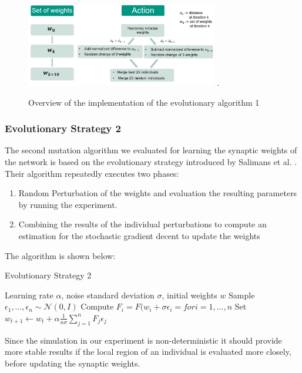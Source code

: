 \begin{figure}[H]
	\centering
	\includegraphics[width=3.3in]{img/evo_strat_1.png}
	\DeclareGraphicsExtensions.
	\caption{Overview of the implementation of the evolutionary algorithm 1}
	\label{fig:evo_strat_1}
\end{figure}

\subsubsection{Evolutionary Strategy 2}
\label{sec:strategie_2}
The second mutation algorithm we evaluated for learning the synaptic weights of the network is based on the evolutionary strategy introduced by Salimans et al. \cite{Salimans2017EvolutionSA}. Their algorithm repeatedly executes two phases:
\begin{enumerate}
	\item Random Perturbation of the weights and evaluation the resulting parameters by running the experiment.
	\item Combining the results of the individual perturbations to compute an estimation for the stochastic gradient decent to update the weights
\end{enumerate}
The algorithm is shown below: 
\begin{algorithm}
	\caption{Evolutionary Strategy 2}
	\begin{algorithmic}[1]
		\renewcommand{\algorithmicrequire}{\textbf{Input:}}
		\REQUIRE Learning rate $\alpha$, noise standard deviation $\sigma$, initial weights $w$
		\STATE Sample $\epsilon_{1},...,\epsilon_{n} \sim \mathcal{N}\left( 0, I \right)$
		\STATE Compute $F_{ i } = F(w_{ i } + \sigma \epsilon_{ i }= for i = 1, ..., n$
		\STATE Set $w_{ t+1 } \leftarrow  w_{ t }+ \alpha \frac{ 1 }{ n \sigma } \sum_{ j = 1 }^{ n }{F_{ j } \epsilon_{ j }  }$
		\ENDFOR
	\end{algorithmic} 
\end{algorithm}
Since the simulation in our experiment is non-deterministic it should provide more stable results if the local region of an individual is evaluated more closely, before updating the synaptic weights.

